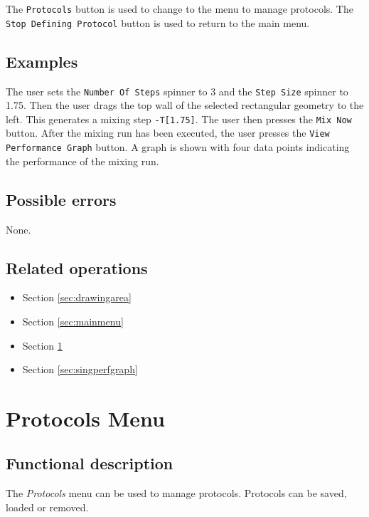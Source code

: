   The \texttt{Protocols} button is used to change to the menu to manage protocols. The \texttt{Stop Defining Protocol} button is used to return to the main menu.

  \subsection*{Examples}
  The user sets the \texttt{Number Of Steps} spinner to 3 and the \texttt{Step Size} spinner to 1.75. Then the user drags the top wall of the selected rectangular geometry to the left. This generates a mixing step \texttt{-T[1.75]}. The user then presses the \texttt{Mix Now} button. After the mixing run has been executed, the user presses the \texttt{View Performance Graph} button. A graph is shown with four data points indicating the performance of the mixing run.
  
  \subsection*{Possible errors}
  None.

  \subsection*{Related operations}
  \begin{itemize}
    \item Section \ref{sec:drawingarea}
    \item Section \ref{sec:mainmenu}
    \item Section \ref{sec:protmenu}
    \item Section \ref{sec:singperfgraph}
  \end{itemize}

\section{Protocols Menu}\label{sec:protmenu}
  \subsection*{Functional description}
  The \emph{Protocols} menu can be used to manage protocols. Protocols can be saved, loaded or removed.

